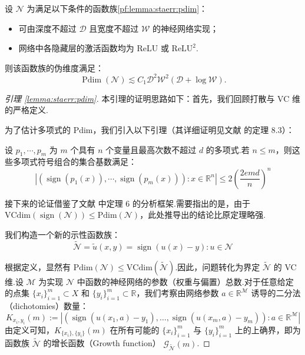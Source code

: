 \begin{lemma}\label{lemma:staerr:pdim}
设 $\mathcal{N}$ 为满足以下条件的函数族\ref{pf:lemma:staerr:pdim}：
\begin{itemize}
\item[(i)] 可由深度不超过 $\mathcal{D}$ 且宽度不超过 $\mathcal{W}$ 的神经网络实现；
\item[(ii)] 网络中各隐藏层的激活函数均为 $\mathrm{ReLU}$ 或 $\mathrm{ReLU}^{2}$.
\end{itemize}
则该函数族的伪维度满足：
\begin{equation*}
\operatorname{Pdim}(\mathcal{N})\lesssim C_1\mathcal{D}^2\mathcal{W}^2(\mathcal{D}+\log\mathcal{W}).
\end{equation*}
\end{lemma}
\begin{proof}[引理 \ref{lemma:staerr:pdim}]\label{pf:lemma:staerr:pdim}
本引理的证明思路如下：首先，我们回顾打散与 VC 维的严格定义.

为了估计多项式的 Pdim，我们引入以下引理（其详细证明见文献 \cite{anthony2009neural} 的定理 8.3）：

\begin{lemma}\label{lemma:covering_number}
设 $p_1,\cdots,p_m$ 为 $m$ 个具有 $n$ 个变量且最高次数不超过 $d$ 的多项式.若 $n \leq m$，则这些多项式符号组合的集合基数满足：
\begin{equation*}
|{(\operatorname{sign}(p_1(x)),\cdots,\operatorname{sign}(p_m(x))):x\in\mathbb{R}^n}| \leq 2\left(\frac{2emd}{n}\right)^n
\end{equation*}

\end{lemma}
接下来的论证借鉴了文献 \cite{bartlett2019nearly} 中定理 6 的分析框架.需要指出的是，由于 $\mathrm{VCdim}(\operatorname{sign}(\mathcal{N})) \leq \mathrm{Pdim}(\mathcal{N})$，此处推导出的结论比原定理略强.

我们构造一个新的示性函数族： 
\begin{equation*}
\mathcal{\widetilde{N}}={\widetilde{u}(x,y)=\operatorname{sign}(u(x)-y): u\in\mathcal{N}}
\end{equation*}

根据定义，显然有 $\mathrm{Pdim}(\mathcal{N}) \leq \mathrm{VCdim}(\widetilde{\mathcal{N}})$.因此，问题转化为界定 $\widetilde{\mathcal{N}}$ 的 VC 维.设 $\mathcal{M}$ 为实现 $\mathcal{N}$ 中函数的神经网络的参数（权重与偏置）总数.对于任意给定的点集 $\{x_i\}_{i=1}^{m}\subset X$ 和 $\{y_i\}_{i=1}^{m}\subset\mathbb{R}$，我们考察由网络参数 $a \in \mathbb{R}^{\mathcal{M}}$ 诱导的二分法（dichotomies）数量：
\begin{equation*}
K_{{x_i},{y_i}}(m):=|{(\operatorname{sign}(u(x_{1}, a)-y_1), \ldots, \operatorname{sign}(u(x_{m}, a)-y_m)): a \in \mathbb{R}^{\mathcal{M}}}|
\end{equation*}
由定义可知，$K_{\{x_i\},\{y_i\}}(m)$ 在所有可能的 $\{x_i\}_{i=1}^{m}$ 与 $\{y_i\}_{i=1}^{m}$ 上的上确界，即为函数族 $\widetilde{\mathcal{N}}$ 的增长函数（Growth function） $\mathcal{G}_{\widetilde{\mathcal{N}}}(m)$.


\end{proof}
